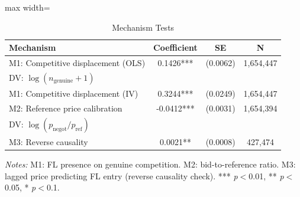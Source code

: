 \begin{table}[htbp]
\centering
\caption{Mechanism Tests}
\label{tab:mechanisms}
\begin{adjustbox}{max width=\textwidth}
\begin{threeparttable}
\small
\begin{tabular}{lccc}
\toprule
Mechanism & Coefficient & SE & N \\
\midrule
M1: Competitive displacement (OLS) & 0.1426*** & (0.0062) & 1,654,447 \\
\quad DV: $\log(n_{\text{genuine}} + 1)$ & & & \\
M1: Competitive displacement (IV) & 0.3244*** & (0.0249) & 1,654,447 \\
M2: Reference price calibration & -0.0412*** & (0.0031) & 1,654,394 \\
\quad DV: $\log(p_{\text{negot}} / p_{\text{ref}})$ & & & \\
M3: Reverse causality & 0.0021** & (0.0008) & 427,474 \\
\bottomrule
\end{tabular}
\begin{tablenotes}
\small
\item \textit{Notes:} M1: FL presence on genuine competition. M2: bid-to-reference ratio.
M3: lagged price predicting FL entry (reverse causality check).
*** \textit{p}$<$0.01, ** \textit{p}$<$0.05, * \textit{p}$<$0.1.
\end{tablenotes}
\end{threeparttable}
\end{adjustbox}
\end{table}
